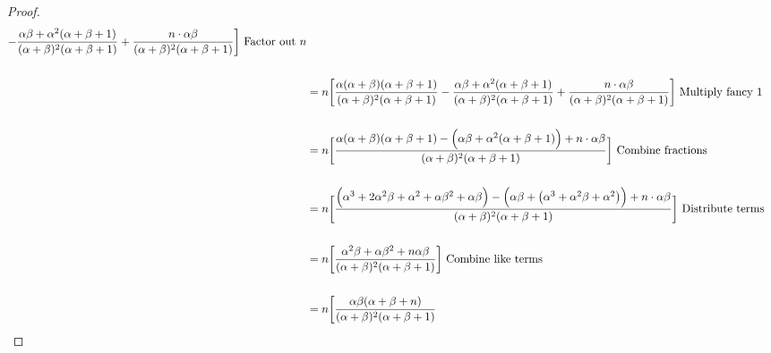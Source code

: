 \documentclass[11pt]{article}
\begin{document}
\begin{enumerate}
\begin{enumerate}[(a)]
\begin{proof}
\begin{align}
                - \frac{\alpha \beta + \alpha^2 (\alpha + \beta + 1)}{(\alpha + \beta)^2 (\alpha + \beta + 1)}
                + \frac{n \cdot \alpha \beta}{(\alpha + \beta)^2 (\alpha + \beta + 1)} \bigg] 
                \notag
                \text{ Factor out \(n\)}
                \\\notag\\&= n \bigg[ \frac{\alpha (\alpha + \beta) (\alpha + \beta + 1)}{(\alpha + \beta)^2 (\alpha + \beta + 1)}
                - \frac{\alpha \beta + \alpha^2 (\alpha + \beta + 1)}{(\alpha + \beta)^2 (\alpha + \beta + 1)}
                + \frac{n \cdot \alpha \beta}{(\alpha + \beta)^2 (\alpha + \beta + 1)} \bigg] 
                \notag
                \text{ Multiply fancy 1}
                \\\notag\\&= n \bigg[
                \frac{
                \alpha (\alpha + \beta) (\alpha + \beta + 1)
                - \Big(\alpha \beta + \alpha^2 (\alpha + \beta + 1)\Big)
                + n \cdot \alpha \beta} {
                (\alpha + \beta)^2 (\alpha + \beta + 1)
                }
                \bigg] 
                \notag
                \text{ Combine fractions}
                \\\notag\\&= n \bigg[
                \frac{
                \Big(\alpha^3 + 2 \alpha^2 \beta + \alpha^2 + \alpha \beta^2 + \alpha \beta \Big)
                - \Big(\alpha \beta + \big(\alpha^3 + \alpha^2\beta + \alpha^2\big)\Big)
                + n \cdot \alpha \beta} {
                (\alpha + \beta)^2 (\alpha + \beta + 1)
                }
                \bigg] 
                \notag
                \text{ Distribute terms}
                \\\notag\\&= n \bigg[
                \frac
                {
                    \alpha^2 \beta
                    + \alpha \beta^2
                    + n \alpha \beta
                }
                {
                    (\alpha + \beta)^2 (\alpha + \beta + 1)
                }
                \bigg] 
                \notag
                \text{ Combine like terms}
                \\\notag\\&= n \bigg[
                \frac
                {
                    \alpha \beta
                    (\alpha + \beta + n)
                }
                {
                    (\alpha + \beta)^2 (\alpha + \beta + 1)
}
\end{align}
\end{proof}
\end{enumerate}
\end{enumerate}
\end{document}
